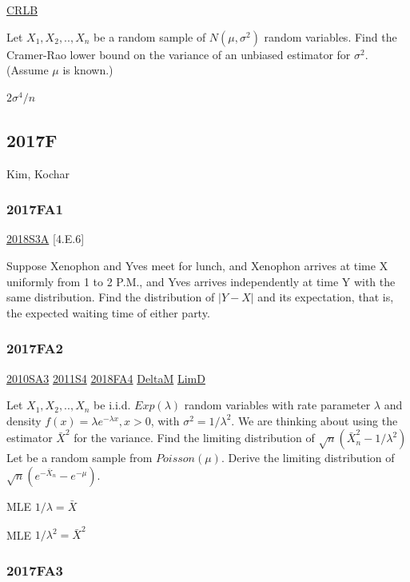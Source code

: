 \documentclass[10pt,twocolumn,portrait]{article}
\begin{document}
\protect\hyperlink{section-5}{CRLB}

Let \(X_1,X_2,..,X_n\) be a random sample of \(N(\mu,\sigma^2)\) random
variables. Find the Cramer-Rao lower bound on the variance of an
unbiased estimator for \(\sigma^2\). (Assume \(\mu\) is known.)

\(2\sigma^4/n\)

\hypertarget{f-12}{%
\subsection{2017F}\label{f-12}}

Kim, Kochar

\hypertarget{fa1-3}{%
\subsubsection{2017FA1}\label{fa1-3}}

\protect\hyperlink{s3a-2}{2018S3A}
{[}4.E.6{]}\protect\hyperlink{section}{}

Suppose Xenophon and Yves meet for lunch, and Xenophon arrives at time X
uniformly from 1 to 2 P.M., and Yves arrives independently at time Y
with the same distribution. Find the distribution of \(|Y-X|\) and its
expectation, that is, the expected waiting time of either party.

\hypertarget{fa2-3}{%
\subsubsection{2017FA2}\label{fa2-3}}

\protect\hyperlink{sa3-1}{2010SA3} \protect\hyperlink{s4-2}{2011S4}
\protect\hyperlink{fa4-4}{2018FA4} \protect\hyperlink{DeltaM}{DeltaM}
\protect\hyperlink{LimD}{LimD}

Let \(X_1,X_2,..,X_n\) be i.i.d. \(Exp(\lambda)\) random variables with
rate parameter \(\lambda\) and density
\(f(x)=\lambda e^{-\lambda x}, x>0\), with \(\sigma^2=1/\lambda^2\). We
are thinking about using the estimator \(\bar X^2\) for the variance.
Find the limiting distribution of \(\sqrt{n}(\bar X_n^2-1/\lambda^2)\)
Let be a random sample from \(Poisson(\mu)\). Derive the limiting
distribution of \(\sqrt{n}(e^{-\bar X_n}-e^{-\mu})\).

MLE \(1/\lambda=\bar X\)

MLE \(1/\lambda^2=\bar X^2\)

\hypertarget{fa3-3}{%
\subsubsection{2017FA3}\label{fa3-3}}
\end{document}
